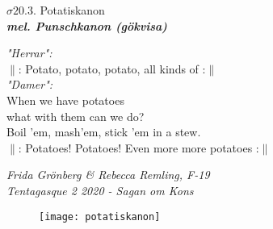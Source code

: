 \documentclass[a6paper,10pt]{article}
\newcommand{\mel}[1]{\small\textbf{\textit{mel. #1 \\}}}
\begin{document}
\begin{center}
\Large $\sigma20.3$. Potatiskanon\\
\mel{Punschkanon (gökvisa)} 
\end{center}
\textit{"Herrar":}
\vspace{3pt}\\
$\|$: Potato, potato, potato, all kinds of :$\|$
\vspace{5pt}\\
\textit{"Damer":}
\vspace{3pt}\\
When we have potatoes\\
what with them can we do?\\
Boil ’em, mash’em, stick ’em in a stew.
\vspace{5pt}\\
$\|$: Potatoes! Potatoes! Even more more potatoes  :$\|$
\begin{flushright}
\textit{Frida Grönberg \& Rebecca Remling, F-19 \\Tentagasque 2 2020 - Sagan om Kons}
\end{flushright}

\vspace{20pt}
\begin{figure}[h!]
\begin{center}
\texttt{[image: potatiskanon]}
\end{center}
\end{figure}

\setlength{\oddsidemargin}{-0.47in}
\end{document}
